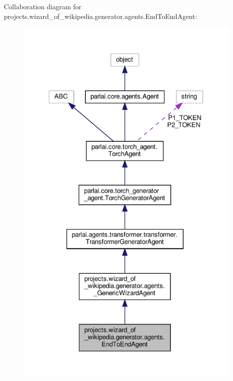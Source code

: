 Collaboration diagram for projects.\+wizard\+\_\+of\+\_\+wikipedia.\+generator.\+agents.\+End\+To\+End\+Agent\+:
\nopagebreak
\begin{figure}[H]
\begin{center}
\leavevmode
\includegraphics[width=318pt]{db/de1/classprojects_1_1wizard__of__wikipedia_1_1generator_1_1agents_1_1EndToEndAgent__coll__graph}
\end{center}
\end{figure}
